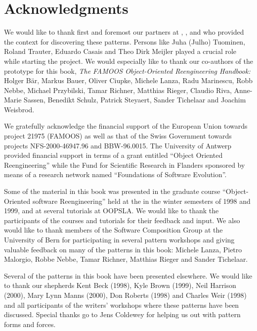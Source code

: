 \documentclass[a4paper,10pt,twoside]{book}
\begin{document}
\section*{Acknowledgments}

We would like to thank first and foremost our  partners at , ,  and  who provided the context for discovering these patterns. Persons like Juha (Julho) Tuominen, Roland Trauter, Eduardo Casais and Theo Dirk Meijler played a crucial role while starting the project. We would especially like to thank our co-authors of the prototype for this book, \emph{The FAMOOS Object-Oriented Reengineering Handbook:} Holger B\"ar, Markus Bauer, Oliver Ciupke, Michele Lanza, Radu Marinescu, Robb Nebbe, Michael Przybilski, Tamar Richner, Matthias Rieger, Claudio Riva, Anne-Marie Sassen, Benedikt Schulz, Patrick Steyaert, Sander Tichelaar and Joachim Weisbrod.

We gratefully acknowledge the financial support of the European Union towards  project 21975 (FAMOOS) as well as that of the Swiss Government towards projects NFS-2000-46947.96 and BBW-96.0015. The University of Antwerp provided financial support in terms of a grant entitled ``Object Oriented Reengineering'' while the Fund for Scientific Research in Flanders sponsored by means of a research network named ``Foundations of Software Evolution''.

Some of the material in this book was presented in the graduate course ``Object-Oriented software Reengineering'' held at the  in the winter semesters of 1998 and 1999, and at several tutorials at OOPSLA. We would like to thank the participants of the courses and tutorials for their feedback and input. We also would like to thank members of the Software Composition Group at the University of Bern for participating in several pattern workshops and giving valuable feedback on many of the patterns in this book: Michele Lanza, Pietro Malorgio, Robbe Nebbe, Tamar Richner, Matthias Rieger and Sander Tichelaar.

Several of the patterns in this book have been presented elsewhere. We would like to thank our  shepherds Kent Beck (1998), Kyle Brown (1999), Neil Harrison (2000), Mary Lynn Manns (2000), Don Roberts (1998) and Charles Weir (1998) and all participants of the writers' workshops where these patterns have been discussed. Special thanks go to Jens Coldewey for helping us out with pattern forms and forces. 
\end{document}
